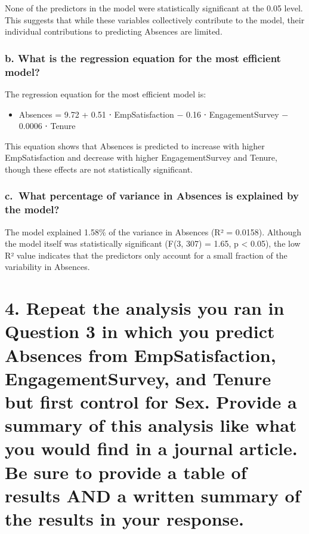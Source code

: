 \documentclass[
]{article}
\providecommand{\tightlist}{%
  \setlength{\itemsep}{0pt}\setlength{\parskip}{0pt}}
\begin{document}
None of the predictors in the model were statistically significant at
the 0.05 level. This suggests that while these variables collectively
contribute to the model, their individual contributions to predicting
Absences are limited.

\subsubsection{b. What is the regression equation for the most efficient
model?}\label{b.-what-is-the-regression-equation-for-the-most-efficient-model-1}

The regression equation for the most efficient model is:

\begin{itemize}
\tightlist
\item
  Absences = 9.72 + 0.51 ⋅ EmpSatisfaction − 0.16 ⋅ EngagementSurvey −
  0.0006 ⋅ Tenure
\end{itemize}

This equation shows that Absences is predicted to increase with higher
EmpSatisfaction and decrease with higher EngagementSurvey and Tenure,
though these effects are not statistically significant.

\subsubsection{c.~What percentage of variance in Absences is explained
by the
model?}\label{c.-what-percentage-of-variance-in-absences-is-explained-by-the-model}

The model explained 1.58\% of the variance in Absences (R² = 0.0158).
Although the model itself was statistically significant (F(3, 307) =
1.65, p \textless{} 0.05), the low R² value indicates that the
predictors only account for a small fraction of the variability in
Absences.

\section{4. Repeat the analysis you ran in Question 3 in which you
predict Absences from EmpSatisfaction, EngagementSurvey, and Tenure but
first control for Sex. Provide a summary of this analysis like what you
would find in a journal article. Be sure to provide a table of results
AND a written summary of the results in your
response.}\label{repeat-the-analysis-you-ran-in-question-3-in-which-you-predict-absences-from-empsatisfaction-engagementsurvey-and-tenure-but-first-control-for-sex.-provide-a-summary-of-this-analysis-like-what-you-would-find-in-a-journal-article.-be-sure-to-provide-a-table-of-results-and-a-written-summary-of-the-results-in-your-response.}
\end{document}
